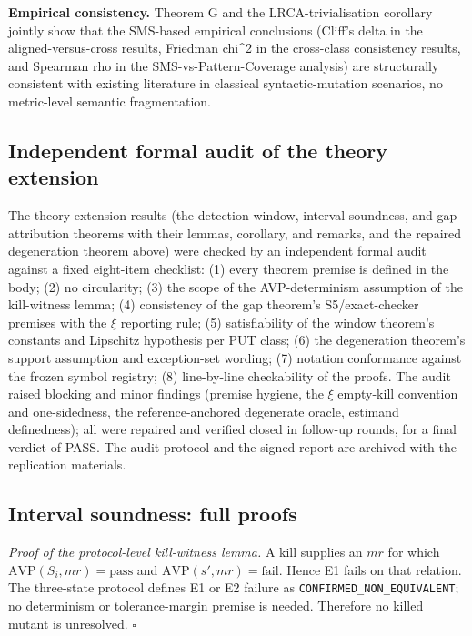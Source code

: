 \documentclass[review,12pt,authoryear]{elsarticle}
\begin{document}
\textbf{Empirical consistency.} Theorem G and the LRCA-trivialisation
corollary jointly
show that the SMS-based empirical conclusions (Cliff's delta in the aligned-versus-cross results,
Friedman chi\^{}2 in the cross-class consistency results, and Spearman rho in the SMS-vs-Pattern-Coverage analysis) are structurally consistent
with existing \citet{d7c38286734419b52de4262c9802ebdfcf4b9447} literature in classical
syntactic-mutation scenarios, no metric-level semantic fragmentation.

\subsection{Independent formal audit of the theory extension}\label{g.5-independent-formal-audit}

The theory-extension results (the detection-window, interval-soundness,
and gap-attribution theorems with their lemmas, corollary, and remarks,
and the repaired degeneration theorem above) were checked by an
independent formal audit against a fixed eight-item checklist: (1)
every theorem premise is defined in the body; (2) no circularity; (3)
the scope of the AVP-determinism assumption of the kill-witness lemma;
(4) consistency of the gap theorem's S5/exact-checker premises with the
$\xi$ reporting rule; (5) satisfiability of the window theorem's
constants and Lipschitz hypothesis per PUT class; (6) the degeneration
theorem's support assumption and exception-set wording; (7) notation
conformance against the frozen symbol registry; (8) line-by-line
checkability of the proofs. The audit raised blocking and minor
findings (premise hygiene, the $\xi$ empty-kill convention and
one-sidedness, the reference-anchored degenerate oracle, estimand
definedness); all were repaired and verified closed in follow-up
rounds, for a final verdict of PASS. The audit protocol and the signed
report are archived with the replication materials.

\subsection{Interval soundness: full proofs}\label{g.6-interval-proofs}

\emph{Proof of the protocol-level kill-witness lemma.} A kill supplies
an \(mr\) for which
\(\mathrm{AVP}(S_i,mr)=\mathrm{pass}\) and
\(\mathrm{AVP}(s',mr)=\mathrm{fail}\). Hence E1 fails on that relation.
The three-state protocol defines E1 or E2 failure as
\texttt{CONFIRMED\_NON\_EQUIVALENT}; no determinism or tolerance-margin
premise is needed. Therefore no killed mutant is unresolved. \(\square\)
\end{document}
